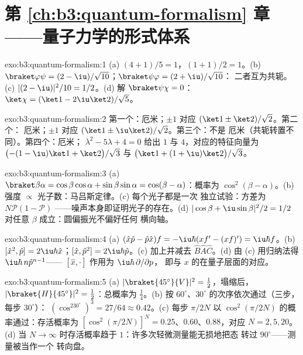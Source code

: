\section*{第 \ref{ch:b3:quantum-formalism} 章——量子力学的形式体系}

\begin{solution}{exo:b3:quantum-formalism:1}
(a) $(4 + 1)/5 = 1$，$(1 + 1)/2 = 1$。(b) $\braket\varphi\psi =
(2 - \iu)/\sqrt{10}$；$\braket\psi\varphi = (2 + \iu)/\sqrt{10}$：
二者互为共轭。(c) $|(2 - \iu)|^2/10 = 1/2$。(d) 解
$\braket\psi\chi = 0$：$\ket\chi = (\ket1 - 2\iu\ket2)/\sqrt5$。
\end{solution}

\begin{solution}{exo:b3:quantum-formalism:2}
第一个：厄米；$\pm1$ 对应 $(\ket1 \pm \ket2)/\sqrt2$。第二个：
厄米；$\pm1$ 对应 $(\ket1 \pm \iu\ket2)/\sqrt2$。第三个：不是
厄米（共轭转置不同）。第四个：厄米；
$\lambda^2 - 5\lambda + 4 = 0$ 给出 $1$ 与 $4$，对应的特征向量为
$\big({-(1 - \iu)}\ket1 + \ket2\big)/\sqrt3$ 与 $\big(\ket1 +
(1 + \iu)\ket2\big)/\sqrt3$。
\end{solution}

\begin{solution}{exo:b3:quantum-formalism:3}
(a) $\braket\beta\alpha = \cos\beta\cos\alpha + \sin\beta\sin\alpha
= \cos(\beta - \alpha)$：概率为 $\cos^2(\beta - \alpha)$。(b)
强度 $\propto$ 光子数：马吕斯定律。(c) 每个光子都是一次
独立试验：方差为 $N\mathcal P(1 - \mathcal P)$
——噪声本身即证明光子的存在。(d) $|\cos\beta + \iu\sin\beta|^2/2
= 1/2$ 对任意 $\beta$ 成立：圆偏振光不偏好任何
横向轴。
\end{solution}

\begin{solution}{exo:b3:quantum-formalism:4}
(a) $(\hat x\hat p - \hat p\hat x)f = -\iu\hbar(xf' - (xf)') =
\iu\hbar f$。(b) $[\hat x^2, \hat p] = 2\iu\hbar\hat x$；$[\hat x,
\hat p^2] = 2\iu\hbar\hat p$。(c) 加上并减去 $\hat B\hat A
\hat C$。(d) 由 (c) 用归纳法得 $\iu\hbar\,n\hat p^{n-1}$——
$[\hat x, \cdot]$ 作用为 $\iu\hbar\,\partial/\partial p$，
即与 $x$ 的在量子层面的对应。
\end{solution}

\begin{solution}{exo:b3:quantum-formalism:5}
(a) $|\braket{45^\circ}{V}|^2 = \tfrac12$，塌缩后，
$|\braket{H}{45^\circ}|^2 = \tfrac12$：总概率为 $\tfrac14$。(b) 按
$60^\circ$、$30^\circ$ 的次序依次通过（三步，每步 $30^\circ$）：
$(\cos^230^\circ)^3 = 27/64 \approx 0.42$。(c) 每步
$\pi/2N$ 以 $\cos^2(\pi/2N)$ 的概率通过：存活概率为 $[\cos^2(\pi/2N)]^N
= 0.25$、$0.60$、$0.88$，对应 $N = 2, 5, 20$。(d) 当 $N \to \infty$
时存活概率趋于 $1$：许多次轻微测量能无损地把态
转过 $90^\circ$——测量被当作一个
转向盘。
\end{solution}

